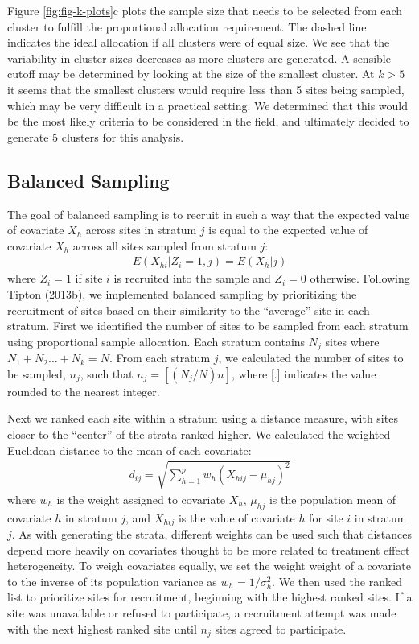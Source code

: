 \documentclass[english,man,floatsintext]{apa6}
\begin{document}
Figure \ref{fig:fig-k-plots}c plots the sample size that needs to be selected from each cluster to fulfill the proportional allocation requirement. The dashed line indicates the ideal allocation if all clusters were of equal size. We see that the variability in cluster sizes decreases as more clusters are generated. A sensible cutoff may be determined by looking at the size of the smallest cluster. At \(k > 5\) it seems that the smallest clusters would require less than 5 sites being sampled, which may be very difficult in a practical setting. We determined that this would be the most likely criteria to be considered in the field, and ultimately decided to generate 5 clusters for this analysis.

\hypertarget{balanced-sampling}{%
\subsection{Balanced Sampling}\label{balanced-sampling}}

The goal of balanced sampling is to recruit in such a way that the expected value of covariate \(X_h\) across sites in stratum \(j\) is equal to the expected value of covariate \(X_h\) across all sites sampled from stratum \(j\):
\begin{align}
E(X_{hi}|Z_i = 1, j) = E(X_h|j)
\end{align}
where \(Z_i = 1\) if site \(i\) is recruited into the sample and \(Z_i = 0\) otherwise. Following Tipton (2013b), we implemented balanced sampling by prioritizing the recruitment of sites based on their similarity to the \enquote{average} site in each stratum. First we identified the number of sites to be sampled from each stratum using proportional sample allocation. Each stratum contains \(N_j\) sites where \(N_1 + N_2 ... + N_k = N\). From each stratum \(j\), we calculated the number of sites to be sampled, \(n_j\), such that \(n_j = [(N_j/N)n]\), where {[}.{]} indicates the value rounded to the nearest integer.

Next we ranked each site within a stratum using a distance measure, with sites closer to the \enquote{center} of the strata ranked higher. We calculated the weighted Euclidean distance to the mean of each covariate:
\begin{align} \label{eq:euclid}
d_{ij} = \sqrt{\sum^p_{h=1}w_h(X_{hij} - \mu_{hj})^2}
\end{align}
where \(w_h\) is the weight assigned to covariate \(X_h\), \(\mu_{hj}\) is the population mean of covariate \(h\) in stratum \(j\), and \(X_{hij}\) is the value of covariate \(h\) for site \(i\) in stratum \(j\). As with generating the strata, different weights can be used such that distances depend more heavily on covariates thought to be more related to treatment effect heterogeneity. To weigh covariates equally, we set the weight weight of a covariate to the inverse of its population variance as \(w_h = 1/\sigma^2_h\). We then used the ranked list to prioritize sites for recruitment, beginning with the highest ranked sites. If a site was unavailable or refused to participate, a recruitment attempt was made with the next highest ranked site until \(n_j\) sites agreed to participate.
\end{document}
